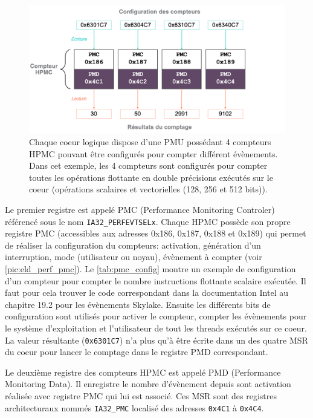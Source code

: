        \begin{figure}[h!]
        \center
        \includegraphics[width=14cm]{images/edl_perf_hpmc.png}
        \caption{\label{pic:edl_perf_hpmc} Chaque coeur logique dispose d'une PMU possédant 4 compteurs HPMC pouvant être configurés pour compter différent évènements. Dans cet exemple, les 4 compteurs sont configurés pour compter toutes les opérations flottante en double précisions exécutés sur le coeur (opérations scalaires et vectorielles (128, 256 et 512 bits)).}
        \end{figure}
        
        Le premier registre est appelé PMC (Performance Monitoring Controler) référencé sous le nom \verb|IA32_PERFEVTSELx|. Chaque HPMC possède son propre registre PMC (accessibles aux adresses 0x186, 0x187, 0x188 et 0x189) qui permet de réaliser la configuration du compteurs: activation, génération d'un interruption, mode (utilisateur ou noyau), évènement à compter (voir \autoref{pic:eld_perf_pmc}). Le \autoref{tab:pmc_config} montre un exemple de configuration d'un compteur pour compter le nombre instructions flottante scalaire exécutée. Il faut pour cela trouver le code correspondant dans la documentation Intel \cite{Intel2018} au chapitre 19.2 pour les évènements Skylake. Ensuite les différents bits de configuration sont utilisés pour activer le compteur, compter les évènements pour le système d'exploitation et l'utilisateur de tout les threads exécutés sur ce coeur. La valeur résultante (\verb|0x6301C7|) n'a plus qu'à être écrite dans un des quatre MSR du coeur pour lancer le comptage dans le registre PMD correspondant.
        
        Le deuxième registre des compteurs HPMC est appelé PMD (Performance Monitoring Data). Il enregistre le nombre d'évènement depuis sont activation réalisée avec registre PMC qui lui est associé. Ces MSR sont des registres architecturaux nommés \verb|IA32_PMC| localisé des adresses \verb|0x4C1| à \verb|0x4C4|.
       
